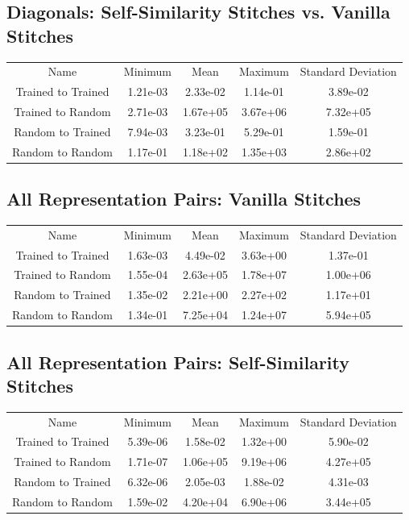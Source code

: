 \documentclass{article} %
\begin{document}
\subsection*{Diagonals: Self-Similarity Stitches vs. Vanilla Stitches}
\begin{tabular}{c c c c c}
   Name&Minimum&Mean&Maximum&Standard Deviation\\
   Trained to Trained&1.21e-03&2.33e-02&1.14e-01&3.89e-02\\
   Trained to Random&2.71e-03&1.67e+05&3.67e+06&7.32e+05\\
   Random to Trained&7.94e-03&3.23e-01&5.29e-01&1.59e-01\\
   Random to Random&1.17e-01&1.18e+02&1.35e+03&2.86e+02\\
\end{tabular}

\subsection*{All Representation Pairs: Vanilla Stitches}
\begin{tabular}{c c c c c}
   Name&Minimum&Mean&Maximum&Standard Deviation\\
   Trained to Trained&1.63e-03&4.49e-02&3.63e+00&1.37e-01\\
   Trained to Random&1.55e-04&2.63e+05&1.78e+07&1.00e+06\\
   Random to Trained&1.35e-02&2.21e+00&2.27e+02&1.17e+01\\
   Random to Random&1.34e-01&7.25e+04&1.24e+07&5.94e+05\\
\end{tabular}

\subsection*{All Representation Pairs: Self-Similarity Stitches}
\begin{tabular}{c c c c c}
   Name&Minimum&Mean&Maximum&Standard Deviation\\
   Trained to Trained&5.39e-06&1.58e-02&1.32e+00&5.90e-02\\
   Trained to Random&1.71e-07&1.06e+05&9.19e+06&4.27e+05\\
   Random to Trained&6.32e-06&2.05e-03&1.88e-02&4.31e-03\\
   Random to Random&1.59e-02&4.20e+04&6.90e+06&3.44e+05\\
\end{tabular}
\end{document}
